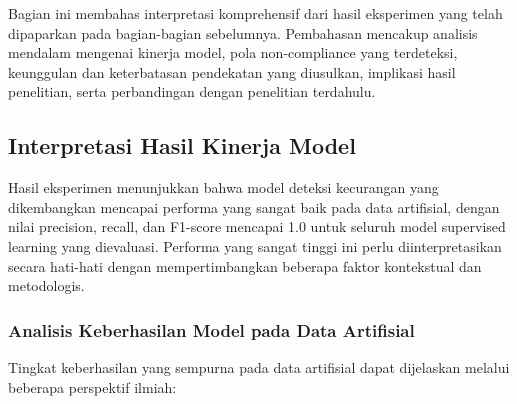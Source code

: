 Bagian ini membahas interpretasi komprehensif dari hasil eksperimen yang telah dipaparkan pada bagian-bagian sebelumnya. Pembahasan mencakup analisis mendalam mengenai kinerja model, pola non-compliance yang terdeteksi, keunggulan dan keterbatasan pendekatan yang diusulkan, implikasi hasil penelitian, serta perbandingan dengan penelitian terdahulu.

\subsection{Interpretasi Hasil Kinerja Model}
\label{subsec:interpretasiKinerjaModel}

Hasil eksperimen menunjukkan bahwa model deteksi kecurangan yang dikembangkan mencapai performa yang sangat baik pada data artifisial, dengan nilai precision, recall, dan F1-score mencapai 1.0 untuk seluruh model supervised learning yang dievaluasi. Performa yang sangat tinggi ini perlu diinterpretasikan secara hati-hati dengan mempertimbangkan beberapa faktor kontekstual dan metodologis.

\subsubsection{Analisis Keberhasilan Model pada Data Artifisial}

Tingkat keberhasilan yang sempurna pada data artifisial dapat dijelaskan melalui beberapa perspektif ilmiah:

